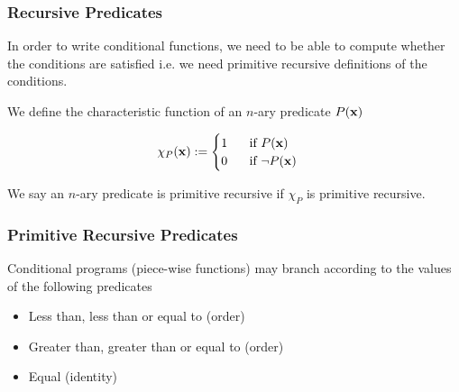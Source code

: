\documentclass{beamer}
\theoremstyle{indentDefn} \newtheorem{defn}[]{Definition}
\begin{document}
\begin{frame}
	\frametitle{Recursive Predicates}	

	In order to write conditional functions, we need to be able to compute whether the conditions are satisfied i.e. we need primitive recursive definitions of the conditions. 

	\vspace{0.5cm}

	We define the characteristic function of an $n$-ary predicate $P({\bf x})$

	\vspace{0.5cm}

	$$\chi_{P}({\bf x}):= \begin{cases}
		1 \hspace{0.5cm} \text{ if } P({\bf x})\\
		0 \hspace{0.5cm} \text{ if } \lnot P({\bf x})
	\end{cases} $$

	We say an $n$-ary predicate is primitive recursive if $\chi_{P}$ is primitive recursive. 

	\vspace{5cm}

\end{frame}

\begin{frame}
	\frametitle{Primitive Recursive Predicates}

	Conditional programs (piece-wise functions) may branch according to the values of the following predicates

	\vspace{0.5cm}

	\begin{itemize}
		\item Less than, less than or equal to (order)
		\item Greater than, greater than or equal to (order)
		\item Equal (identity)
	\end{itemize}

	\vspace{5cm}

\end{frame}
\end{document}
